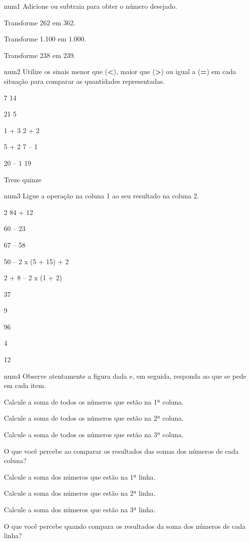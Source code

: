 {}

\subsubject[title={Atividades},reference={atividades}]

num1 Adicione ou subtraia para obter o número desejado.

Transforme 262 em 362.\crlf

Transforme 1.100 em 1.000.\crlf

Transforme 238 em 239.\crlf

num2 Utilize os sinais menor que ({\bf <}), maior que ({\bf >}) ou igual
a ({\bf =}) em cada situação para comparar as quantidades representadas.

7 14

21 5

1 + 3 2 + 2

5 + 2 7 -- 1

20 -- 1 19

Treze quinze

num3 Ligue a operação na coluna 1 ao seu resultado na coluna 2.

2 84 + 12

60 -- 23

67 -- 58

50 -- 2 x (5 + 15) + 2

2 + 8 -- 2 x (1 + 2)

37

9

96

4

12

num4 Observe atentamente a figura dada e, em seguida, responda ao que se
pede em cada item.

{}

Calcule a soma de todos os números que estão na 1ª coluna.

Calcule a soma de todos os números que estão na 2ª coluna.

Calcule a soma de todos os números que estão na 3ª coluna.

O que você percebe ao comparar os resultados das somas dos números de
cada coluna?

Calcule a soma dos números que estão na 1ª linha.

Calcule a soma dos números que estão na 2ª linha.

Calcule a soma dos números que estão na 3ª linha.

O que você percebe quando compara os resultados da soma dos números de
cada linha?

